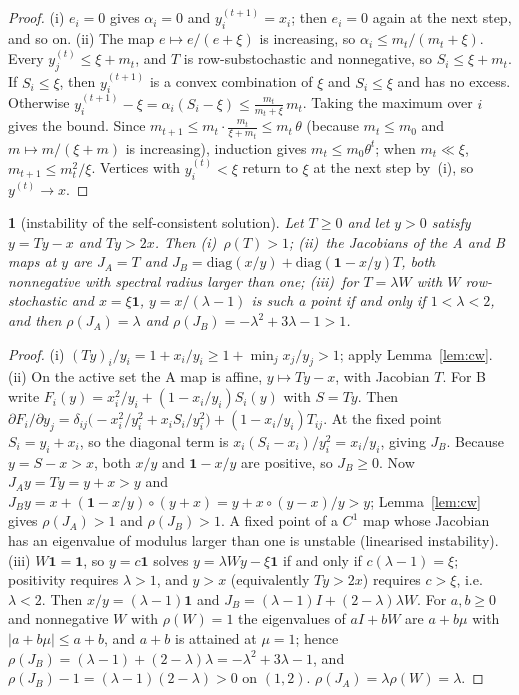 \documentclass[11pt,a4paper]{article}
\theoremstyle{definition}
\theoremstyle{plain}
\newcommand{\genpropname}{}
\newtheorem*{genprop}{\genpropname}
\newenvironment{prop}[1]{\renewcommand{\genpropname}{Proposition #1}\begin{genprop}}{\end{genprop}}
\newcommand{\diag}{\mathrm{diag}}
\newcommand{\one}{\mathbf{1}}
\begin{document}
\begin{proof}
(i) $e_i=0$ gives $\alpha_i=0$ and $y_i^{(t+1)}=x_i$; then $e_i=0$ again at the next step, and so on. (ii) The map $e\mapsto e/(e+\xi)$ is increasing, so $\alpha_i\le m_t/(m_t+\xi)$. Every $y_j^{(t)}\le\xi+m_t$, and $T$ is row-substochastic and nonnegative, so $S_i\le\xi+m_t$. If $S_i\le\xi$, then $y_i^{(t+1)}$ is a convex combination of $\xi$ and $S_i\le\xi$ and has no excess. Otherwise $y_i^{(t+1)}-\xi=\alpha_i(S_i-\xi)\le\frac{m_t}{m_t+\xi}\,m_t$. Taking the maximum over $i$ gives the bound. Since $m_{t+1}\le m_t\cdot\frac{m_t}{\xi+m_t}\le m_t\,\theta$ (because $m_t\le m_0$ and $m\mapsto m/(\xi+m)$ is increasing), induction gives $m_t\le m_0\theta^t$; when $m_t\ll\xi$, $m_{t+1}\le m_t^2/\xi$. Vertices with $y^{(t)}_i<\xi$ return to $\xi$ at the next step by~(i), so $y^{(t)}\to x$.
\end{proof}

\begin{prop}{C}[instability of the self-consistent solution]
Let $T\ge0$ and let $y>0$ satisfy $y=Ty-x$ and $Ty>2x$. Then (i)~$\rho(T)>1$; (ii)~the Jacobians of the A and B maps at $y$ are $J_A=T$ and $J_B=\diag(x/y)+\diag(\one-x/y)T$, both nonnegative with spectral radius larger than one; (iii)~for $T=\lambda W$ with $W$ row-stochastic and $x=\xi\one$, $y=x/(\lambda-1)$ is such a point if and only if $1<\lambda<2$, and then $\rho(J_A)=\lambda$ and $\rho(J_B)=-\lambda^2+3\lambda-1>1$.
\end{prop}

\begin{proof}
(i) $(Ty)_i/y_i=1+x_i/y_i\ge1+\min_jx_j/y_j>1$; apply Lemma~\ref{lem:cw}. (ii) On the active set the A map is affine, $y\mapsto Ty-x$, with Jacobian $T$. For B write $F_i(y)=x_i^2/y_i+(1-x_i/y_i)S_i(y)$ with $S=Ty$. Then $\partial F_i/\partial y_j=\delta_{ij}\big(-x_i^2/y_i^2+x_iS_i/y_i^2\big)+(1-x_i/y_i)T_{ij}$. At the fixed point $S_i=y_i+x_i$, so the diagonal term is $x_i(S_i-x_i)/y_i^2=x_i/y_i$, giving $J_B$. Because $y=S-x>x$, both $x/y$ and $\one-x/y$ are positive, so $J_B\ge0$. Now $J_Ay=Ty=y+x>y$ and $J_By=x+(\one-x/y)\circ(y+x)=y+x\circ(y-x)/y>y$; Lemma~\ref{lem:cw} gives $\rho(J_A)>1$ and $\rho(J_B)>1$. A fixed point of a $C^1$ map whose Jacobian has an eigenvalue of modulus larger than one is unstable (linearised instability). (iii) $W\one=\one$, so $y=c\one$ solves $y=\lambda Wy-\xi\one$ if and only if $c(\lambda-1)=\xi$; positivity requires $\lambda>1$, and $y>x$ (equivalently $Ty>2x$) requires $c>\xi$, i.e.\ $\lambda<2$. Then $x/y=(\lambda-1)\one$ and $J_B=(\lambda-1)I+(2-\lambda)\lambda W$. For $a,b\ge0$ and nonnegative $W$ with $\rho(W)=1$ the eigenvalues of $aI+bW$ are $a+b\mu$ with $|a+b\mu|\le a+b$, and $a+b$ is attained at $\mu=1$; hence $\rho(J_B)=(\lambda-1)+(2-\lambda)\lambda=-\lambda^2+3\lambda-1$, and $\rho(J_B)-1=(\lambda-1)(2-\lambda)>0$ on $(1,2)$. $\rho(J_A)=\lambda\rho(W)=\lambda$.
\end{proof}
\end{document}
